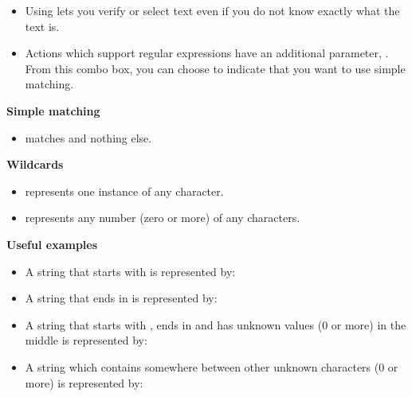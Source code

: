 

\begin{itemize}
\item Using  lets you verify or select text even if you do not know exactly what the text is.
\item Actions which support regular expressions have an additional parameter, . From this combo box, you can choose  to indicate that you want to use simple matching.
\end{itemize}

\textbf{Simple matching}
\begin{itemize}
\item {} matches  and nothing else.
\end{itemize}

\textbf{Wildcards}
\begin{itemize}
\item {} represents one instance of any character.
\item \bxshell{*} represents any number (zero or more) of any characters.  
\end{itemize}

\textbf{Useful examples}
\begin{itemize}
\item A string that starts with  is represented by: 
\item A string that ends in  is represented by: 
\item A string that starts with , ends in  and has unknown values (0 or more) in the middle is represented by: 
\item A string which contains  somewhere between other unknown characters (0 or more) is represented by: 
\end{itemize}
 
